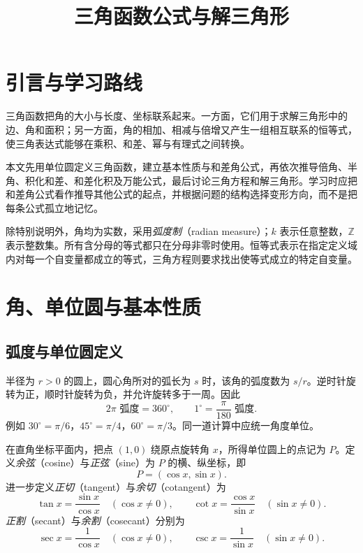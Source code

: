 \documentclass[UTF8,12pt,a4paper,fontset=fandol]{ctexart}
\title{三角函数公式与解三角形}
\author{}
\date{}
\begin{document}
\maketitle
\tableofcontents

\section{引言与学习路线}

三角函数把角的大小与长度、坐标联系起来。一方面，它们用于求解三角形中的边、角和面积；另一方面，角的相加、相减与倍增又产生一组相互联系的恒等式，使三角表达式能够在乘积、和差、幂与有理式之间转换。

本文先用单位圆定义三角函数，建立基本性质与和差角公式，再依次推导倍角、半角、积化和差、和差化积及万能公式，最后讨论三角方程和解三角形。学习时应把和差角公式看作推导其他公式的起点，并根据问题的结构选择变形方向，而不是把每条公式孤立地记忆。

除特别说明外，角均为实数，采用\emph{弧度制}（radian measure）；$k$ 表示任意整数，$\mathbb Z$ 表示整数集。所有含分母的等式都只在分母非零时使用。恒等式表示在指定定义域内对每一个自变量都成立的等式，三角方程则要求找出使等式成立的特定自变量。

\section{角、单位圆与基本性质}
\label{sec:trig-basics}

\subsection{弧度与单位圆定义}

半径为 $r>0$ 的圆上，圆心角所对的弧长为 $s$ 时，该角的弧度数为 $s/r$。逆时针旋转为正，顺时针旋转为负，并允许旋转多于一周。因此
\[
  2\pi\text{ 弧度}=360^\circ,\qquad
  1^\circ=\frac{\pi}{180}\text{ 弧度}.
\]
例如 $30^\circ=\pi/6$，$45^\circ=\pi/4$，$60^\circ=\pi/3$。同一道计算中应统一角度单位。

\begin{definition}[三角函数]
在直角坐标平面内，把点 $(1,0)$ 绕原点旋转角 $x$，所得单位圆上的点记为 $P$。定义\emph{余弦}（cosine）与\emph{正弦}（sine）为 $P$ 的横、纵坐标，即
\[
  P=(\cos x,\sin x).
\]
进一步定义\emph{正切}（tangent）与\emph{余切}（cotangent）为
\[
  \tan x=\frac{\sin x}{\cos x}\quad(\cos x\ne0),\qquad
  \cot x=\frac{\cos x}{\sin x}\quad(\sin x\ne0).
\]
\emph{正割}（secant）与\emph{余割}（cosecant）分别为
\[
  \sec x=\frac1{\cos x}\quad(\cos x\ne0),\qquad
  \csc x=\frac1{\sin x}\quad(\sin x\ne0).
\]
\end{definition}
\end{document}
